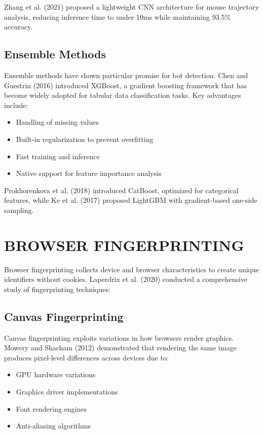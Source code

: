 Zhang et al. (2021) proposed a lightweight CNN architecture for mouse trajectory analysis, reducing inference time to under 10ms while maintaining 93.5\% accuracy.

\subsection{Ensemble Methods}

Ensemble methods have shown particular promise for bot detection. Chen and Guestrin (2016) introduced XGBoost, a gradient boosting framework that has become widely adopted for tabular data classification tasks. Key advantages include:
\begin{itemize}
    \item Handling of missing values
    \item Built-in regularization to prevent overfitting
    \item Fast training and inference
    \item Native support for feature importance analysis
\end{itemize}

Prokhorenkova et al. (2018) introduced CatBoost, optimized for categorical features, while Ke et al. (2017) proposed LightGBM with gradient-based one-side sampling.

\section{BROWSER FINGERPRINTING}

Browser fingerprinting collects device and browser characteristics to create unique identifiers without cookies. Laperdrix et al. (2020) conducted a comprehensive study of fingerprinting techniques:

\subsection{Canvas Fingerprinting}

Canvas fingerprinting exploits variations in how browsers render graphics. Mowery and Shacham (2012) demonstrated that rendering the same image produces pixel-level differences across devices due to:
\begin{itemize}
    \item GPU hardware variations
    \item Graphics driver implementations
    \item Font rendering engines
    \item Anti-aliasing algorithms
\end{itemize}

